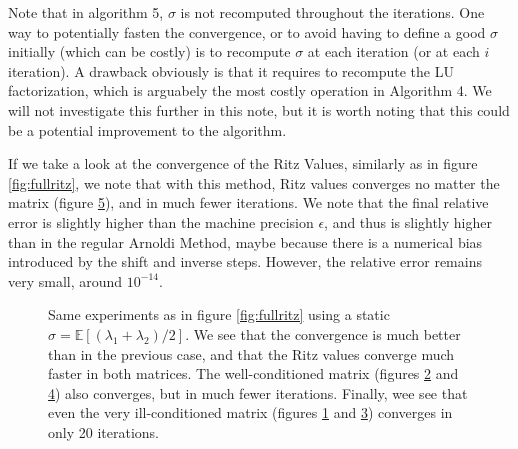 \documentclass[11pt]{article}
\numberwithin{equation}{section}
\begin{document}
Note that in algorithm 5, $\sigma$ is not recomputed throughout the iterations. One way to potentially fasten the convergence, or to avoid having to define a good $\sigma$ initially (which can be costly) is to recompute $\sigma$ at each iteration (or at each $i$ iteration). A drawback obviously is that it requires to recompute the LU factorization, which is arguabely the most costly operation in Algorithm 4. We will not investigate this further in this note, but it is worth noting that this could be a potential improvement to the algorithm.

If we take a look at the convergence of the Ritz Values, similarly as in figure \ref{fig:fullritz}, we note that with this method, Ritz values converges no matter the matrix (figure \ref{fig:shiftritz_full}), and in much fewer iterations. We note that the final relative error is slightly higher than the machine precision $\epsilon$, and thus is slightly higher than in the regular Arnoldi Method, maybe because there is a numerical bias introduced by the shift and inverse steps. However, the relative error remains very small, around $10^{-14}$.

\begin{figure}
    \centering
    \begin{subfigure}[b]{.45\linewidth}
        
        \caption{}
        \label{fig:ritz_shift_bad}
    \end{subfigure}\hspace{0.05\linewidth}
    \begin{subfigure}[b]{.45\linewidth}
        
        \caption{}
        \label{fig:ritz_shift_good}
    \end{subfigure}
    \begin{subfigure}[b]{.45\linewidth}
        
        \caption{}
        \label{fig:sign_shift_bad}
    \end{subfigure}\hspace{0.05\linewidth}
    \begin{subfigure}[b]{.45\linewidth}
        
        \caption{}
        \label{fig:sign_shift_good}
    \end{subfigure}
    \caption{Same experiments as in figure \ref{fig:fullritz} using a static $\sigma=\mathbb{E}[(\lambda_1+\lambda_2)/2]$. We see that the convergence is much better than in the previous case, and that the Ritz values converge much faster in both matrices. The well-conditioned matrix (figures \ref{fig:ritz_shift_good} and \ref{fig:sign_shift_good}) also converges, but in much fewer iterations. Finally, wee see that even the very ill-conditioned matrix (figures \ref{fig:ritz_shift_bad} and \ref{fig:sign_shift_bad}) converges in only 20 iterations.}
    \label{fig:shiftritz_full}
\end{figure}
\end{document}
